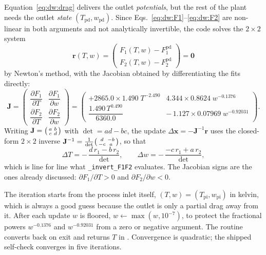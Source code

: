 Equation~\eqref{eq:dw:drag} delivers the outlet \emph{potentials}, but the
rest of the plant needs the outlet \emph{state}
$(T_{\mathrm{pd}},w_{\mathrm{pd}})$. Since
Eqs.~\eqref{eq:dw:F1}--\eqref{eq:dw:F2} are non-linear in both arguments and
not analytically invertible, the code solves the $2\times2$ system
\begin{equation}
\mathbf{r}(T,w)=
\begin{pmatrix}
F_1(T,w)-F_1^{\mathrm{pd}}\\[2pt]
F_2(T,w)-F_2^{\mathrm{pd}}
\end{pmatrix}=\mathbf{0}
\label{eq:dw:residual}
\end{equation}
by Newton's method, with the Jacobian obtained by differentiating the fits
directly:
\begin{equation}
\mathbf{J}=
\begin{pmatrix}
\dfrac{\partial F_1}{\partial T} & \dfrac{\partial F_1}{\partial w}\\[10pt]
\dfrac{\partial F_2}{\partial T} & \dfrac{\partial F_2}{\partial w}
\end{pmatrix}
=
\begin{pmatrix}
+2865.0\times 1.490\;T^{-2.490} & 4.344\times 0.8624\;w^{-0.1376}\\[6pt]
\dfrac{1.490\,T^{0.490}}{6360.0} & -\,1.127\times 0.07969\;w^{-0.92031}
\end{pmatrix}.
\label{eq:dw:jacobian}
\end{equation}
Writing $\mathbf{J}=\begin{psmallmatrix}a&b\\c&d\end{psmallmatrix}$ with
$\det = ad-bc$, the update $\Delta\mathbf{x}=-\mathbf{J}^{-1}\mathbf{r}$ uses
the closed-form $2\times2$ inverse
$\mathbf{J}^{-1}=\tfrac{1}{\det}\begin{psmallmatrix}d&-b\\-c&a\end{psmallmatrix}$,
so that
\begin{equation}
\Delta T = -\,\frac{d\,r_1 - b\,r_2}{\det},
\qquad
\Delta w = -\,\frac{-c\,r_1 + a\,r_2}{\det},
\label{eq:dw:update}
\end{equation}
which is line for line what \texttt{\_invert\_F1F2} evaluates. The Jacobian
signs are the ones already discussed: $\partial F_1/\partial T>0$ and
$\partial F_2/\partial w<0$.

The iteration starts from the process inlet itself,
$(T,w)=(T_{\mathrm{pi}},w_{\mathrm{pi}})$ in kelvin, which is always a good
guess because the outlet is only a partial drag away from it. After each
update $w$ is floored, $w \leftarrow \max(w,10^{-7})$, to protect the
fractional powers $w^{-0.1376}$ and $w^{-0.92031}$ from a zero or negative
argument. The routine converts back on exit and returns $T$ in \degC.
Convergence is quadratic; the shipped self-check converges in five iterations.


